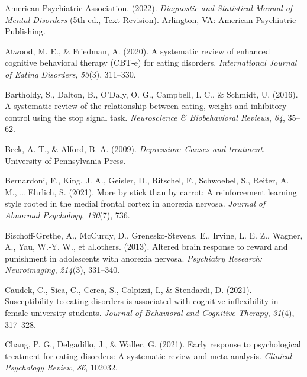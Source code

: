 \documentclass[
  man,floatsintext]{apa6}
\newlength{\cslhangindent}
\newlength{\cslentryspacingunit} %
\newenvironment{CSLReferences}[2] %
 {%
  \setlength{\parindent}{0pt}
  \ifodd #1
  \let\oldpar\par
  \def\par{\hangindent=\cslhangindent\oldpar}
  \fi
  \setlength{\parskip}{#2\cslentryspacingunit}
 }%
 {}
\begin{document}
\hypertarget{refs}{}
\begin{CSLReferences}{1}{0}
\leavevmode{}%
American Psychiatric Association. (2022). \emph{{Diagnostic and Statistical Manual of Mental Disorders}} (5th ed., Text Revision). Arlington, VA: {American Psychiatric Publishing}.

\leavevmode{}%
Atwood, M. E., \& Friedman, A. (2020). A systematic review of enhanced cognitive behavioral therapy (CBT-e) for eating disorders. \emph{International Journal of Eating Disorders}, \emph{53}(3), 311--330.

\leavevmode{}%
Bartholdy, S., Dalton, B., O'Daly, O. G., Campbell, I. C., \& Schmidt, U. (2016). A systematic review of the relationship between eating, weight and inhibitory control using the stop signal task. \emph{Neuroscience \& Biobehavioral Reviews}, \emph{64}, 35--62.

\leavevmode{}%
Beck, A. T., \& Alford, B. A. (2009). \emph{Depression: Causes and treatment}. University of Pennsylvania Press.

\leavevmode{}%
Bernardoni, F., King, J. A., Geisler, D., Ritschel, F., Schwoebel, S., Reiter, A. M., \ldots{} Ehrlich, S. (2021). More by stick than by carrot: A reinforcement learning style rooted in the medial frontal cortex in anorexia nervosa. \emph{Journal of Abnormal Psychology}, \emph{130}(7), 736.

\leavevmode{}%
Bischoff-Grethe, A., McCurdy, D., Grenesko-Stevens, E., Irvine, L. E. Z., Wagner, A., Yau, W.-Y. W., et al.others. (2013). Altered brain response to reward and punishment in adolescents with anorexia nervosa. \emph{Psychiatry Research: Neuroimaging}, \emph{214}(3), 331--340.

\leavevmode{}%
Caudek, C., Sica, C., Cerea, S., Colpizzi, I., \& Stendardi, D. (2021). Susceptibility to eating disorders is associated with cognitive inflexibility in female university students. \emph{Journal of Behavioral and Cognitive Therapy}, \emph{31}(4), 317--328.

\leavevmode{}%
Chang, P. G., Delgadillo, J., \& Waller, G. (2021). Early response to psychological treatment for eating disorders: A systematic review and meta-analysis. \emph{Clinical Psychology Review}, \emph{86}, 102032.


\end{CSLReferences}
\end{document}
